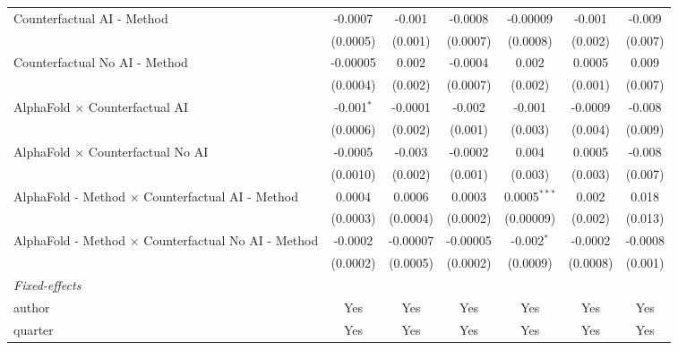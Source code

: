 \begin{tabular}{lcccccc}
   Counterfactual AI - Method                                 & -0.0007       & -0.001   & -0.0008  & -0.00009       & -0.001      & -0.009\\   
                                                              & (0.0005)      & (0.001)  & (0.0007) & (0.0008)       & (0.002)     & (0.007)\\   
   Counterfactual No AI - Method                              & -0.00005      & 0.002    & -0.0004  & 0.002          & 0.0005      & 0.009\\   
                                                              & (0.0004)      & (0.002)  & (0.0007) & (0.002)        & (0.001)     & (0.007)\\   
   AlphaFold $\times$ Counterfactual AI                       & -0.001$^{*}$  & -0.0001  & -0.002   & -0.001         & -0.0009     & -0.008\\   
                                                              & (0.0006)      & (0.002)  & (0.001)  & (0.003)        & (0.004)     & (0.009)\\   
   AlphaFold $\times$ Counterfactual No AI                    & -0.0005       & -0.003   & -0.0002  & 0.004          & 0.0005      & -0.008\\   
                                                              & (0.0010)      & (0.002)  & (0.001)  & (0.003)        & (0.003)     & (0.007)\\   
   AlphaFold - Method $\times$ Counterfactual AI - Method     & 0.0004        & 0.0006   & 0.0003   & 0.0005$^{***}$ & 0.002       & 0.018\\   
                                                              & (0.0003)      & (0.0004) & (0.0002) & (0.00009)      & (0.002)     & (0.013)\\   
   AlphaFold - Method $\times$ Counterfactual No AI - Method  & -0.0002       & -0.00007 & -0.00005 & -0.002$^{*}$   & -0.0002     & -0.0008\\   
                                                              & (0.0002)      & (0.0005) & (0.0002) & (0.0009)       & (0.0008)    & (0.001)\\   
   \midrule
   \emph{Fixed-effects}\\
   author                                                     & Yes           & Yes      & Yes      & Yes            & Yes         & Yes\\  
   quarter                                                    & Yes           & Yes      & Yes      & Yes            & Yes         & Yes\\  

\end{tabular}
